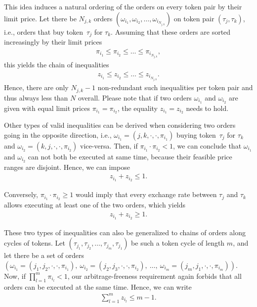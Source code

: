\documentclass[11pt,parskip=full]{scrartcl}%
\newcommand*{\ie}{i.e., }
\begin{document}
This idea induces a natural ordering of the orders on every token pair by their limit price.
Let there be $N_{j,k}$ orders $(\omega_{i_1}, \omega_{i_2}, \ldots, \omega_{i_{N_{j,k}}})$
on token pair $(\tau_j,\tau_k)$, \ie orders that buy token~$\tau_j$ for $\tau_k$.
Assuming that these orders are sorted increasingly by their limit prices
\begin{align*}
  \pi_{i_1} \le \pi_{i_2} \le \ldots \le \pi_{i_{N_{j,k}}},
\end{align*}
this yields the chain of inequalities
\begin{align}
  z_{i_1} \le z_{i_2} \le \ldots \le z_{i_{N_{j,k}}}.
  \label{eq:valid_inequality_A}
\end{align}
Hence, there are only $N_{j,k} - 1$ non-redundant such inequalities per token pair and thus
always less than $N$ overall.
Please note that if two orders $\omega_{i_1}$ and $\omega_{i_2}$ are given with equal limit
prices $\pi_{i_1} = \pi_{i_2}$, the equality $z_{i_1} = z_{i_2}$ needs to hold.

Other types of valid inequalities can be derived when considering two orders going in the
opposite direction, \ie $\omega_{i_1} = (j,k,\cdot,\cdot,\pi_{i_1})$ buying token~$\tau_j$ for
$\tau_k$ and $\omega_{i_2} = (k,j,\cdot,\cdot,\pi_{i_2})$ vice-versa.
Then, if $\pi_{i_1} \cdot \pi_{i_2} < 1$, we can conclude that $\omega_{i_1}$ and $\omega_{i_2}$
can not both be executed at same time, because their feasible price ranges are disjoint.
Hence, we can impose
\begin{align*}
  z_{i_1} + z_{i_2} \le 1.
\end{align*}

Conversely, $\pi_{i_1} \cdot \pi_{i_2} \ge 1$ would imply that every exchange rate between
$\tau_j$ and $\tau_k$ allows executing at least one of the two orders, which yields
\begin{align*}
  z_{i_1} + z_{i_2} \ge 1.
\end{align*}

These two types of inequalities can also be generalized to chains of orders along cycles of tokens.
Let $(\tau_{j_1}, \tau_{j_2}, \ldots, \tau_{j_m}, \tau_{j_1})$ be such a token cycle of
length $m$, and let there be a set of orders
$\left(
\omega_{i_1} = (j_1,j_2,\cdot,\cdot,\pi_{i_1}), \>
\omega_{i_2} = (j_2,j_3,\cdot,\cdot,\pi_{i_2}), \>
\ldots, \>
\omega_{i_m} = (j_m,j_1,\cdot,\cdot,\pi_{i_m})
\right)$.
Now, if $\prod_{l=1}^m \pi_{i_l} < 1$, our arbitrage-freeness requirement again forbids that all
orders can be executed at the same time. Hence, we can write
\begin{align}
  \sum\limits_{l=1}^m z_{i_l} \le m-1.
  \label{eq:valid_inequality_B1}
\end{align}
\end{document}
